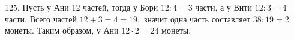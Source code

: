 125. Пусть у Ани 12 частей, тогда у Бори $12:4=3$ части, а у Вити $12:3=4$ части. Всего частей $12+3=4=19,$ значит одна часть составляет $38:19=2$ монеты. Таким образом, у Ани $12\cdot2=24$ монеты.\\
